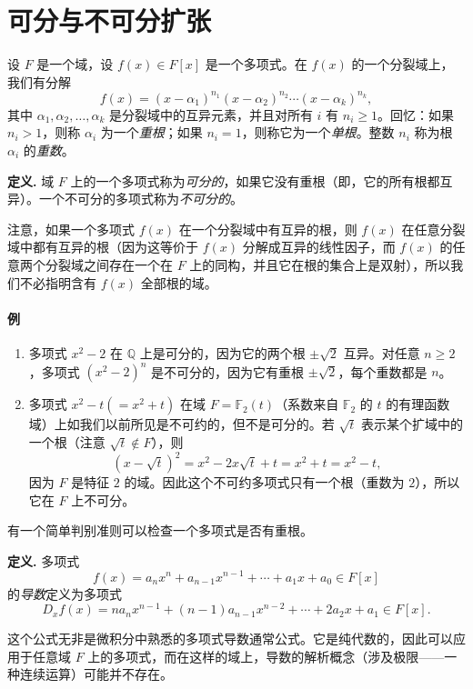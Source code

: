 \section{可分与不可分扩张}

设 $F$ 是一个域，设 $f(x)\in F[x]$ 是一个多项式。在 $f(x)$ 的一个分裂域上，我们有分解
\[
f(x)=(x-\alpha_1)^{n_1}(x-\alpha_2)^{n_2}\cdots(x-\alpha_k)^{n_k},
\]
其中 $\alpha_1,\alpha_2,\ldots,\alpha_k$ 是分裂域中的互异元素，并且对所有 $i$ 有 $n_i\geq 1$。回忆：如果 $n_i>1$，则称 $\alpha_i$ 为一个\emph{重根}；如果 $n_i=1$，则称它为一个\emph{单根}。整数 $n_i$ 称为根 $\alpha_i$ 的\emph{重数}。

\noindent\textbf{定义.} 域 $F$ 上的一个多项式称为\emph{可分的}，如果它没有重根（即，它的所有根都互异）。一个不可分的多项式称为\emph{不可分的}。

注意，如果一个多项式 $f(x)$ 在一个分裂域中有互异的根，则 $f(x)$ 在任意分裂域中都有互异的根（因为这等价于 $f(x)$ 分解成互异的线性因子，而 $f(x)$ 的任意两个分裂域之间存在一个在 $F$ 上的同构，并且它在根的集合上是双射），所以我们不必指明含有 $f(x)$ 全部根的域。

\paragraph{例}
\begin{enumerate}[label=(\arabic*)]
	\item 多项式 $x^2-2$ 在 $\mathbb Q$ 上是可分的，因为它的两个根 $\pm\sqrt2$ 互异。对任意 $n\geq 2$，多项式 $(x^2-2)^n$ 是不可分的，因为它有重根 $\pm\sqrt2$，每个重数都是 $n$。
	
	\item 多项式 $x^2-t(=x^2+t)$ 在域 $F=\mathbb F_2(t)$（系数来自 $\mathbb F_2$ 的 $t$ 的有理函数域）上如我们以前所见是不可约的，但不是可分的。若 $\sqrt t$ 表示某个扩域中的一个根（注意 $\sqrt t\notin F$），则
	\[
	(x-\sqrt t)^2=x^2-2x\sqrt t+t=x^2+t=x^2-t,
	\]
	因为 $F$ 是特征 $2$ 的域。因此这个不可约多项式只有一个根（重数为 $2$），所以它在 $F$ 上不可分。
\end{enumerate}

有一个简单判别准则可以检查一个多项式是否有重根。

\noindent\textbf{定义.} 多项式
\[
f(x)=a_nx^n+a_{n-1}x^{n-1}+\cdots+a_1x+a_0\in F[x]
\]
的\emph{导数}定义为多项式
\[
D_xf(x)=na_nx^{n-1}+(n-1)a_{n-1}x^{n-2}+\cdots+2a_2x+a_1\in F[x].
\]

这个公式无非是微积分中熟悉的多项式导数通常公式。它是纯代数的，因此可以应用于任意域 $F$ 上的多项式，而在这样的域上，导数的解析概念（涉及极限——一种连续运算）可能并不存在。


